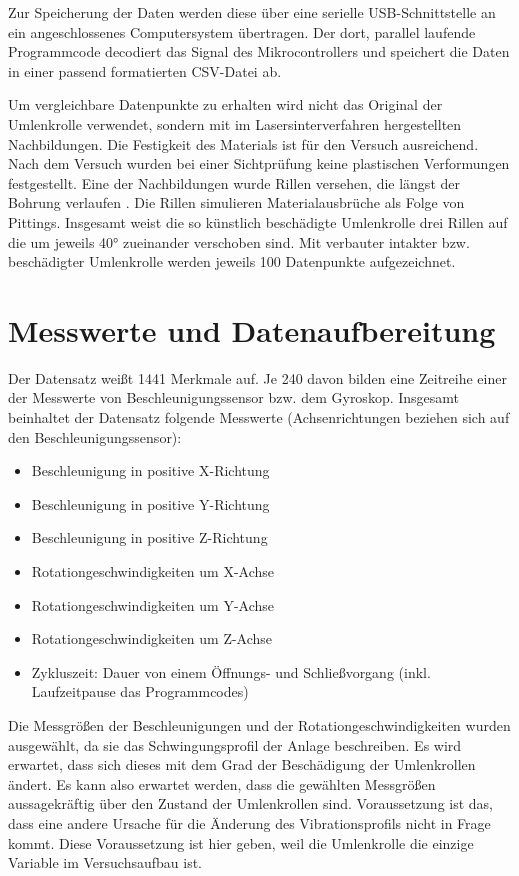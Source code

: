 Zur Speicherung der Daten werden diese über eine serielle USB-Schnittstelle an ein angeschlossenes Computersystem übertragen. Der dort, parallel laufende Programmcode decodiert das Signal des Mikrocontrollers und speichert die Daten in einer passend formatierten CSV-Datei ab.

Um vergleichbare Datenpunkte zu erhalten wird nicht das Original der Umlenkrolle verwendet, sondern mit im Lasersinterverfahren hergestellten Nachbildungen. Die Festigkeit des Materials ist für den Versuch ausreichend. Nach dem Versuch wurden bei einer Sichtprüfung keine plastischen Verformungen festgestellt. Eine der Nachbildungen wurde Rillen versehen, die längst der Bohrung verlaufen . Die Rillen simulieren Materialausbrüche als Folge von Pittings. Insgesamt weist die so künstlich beschädigte Umlenkrolle drei Rillen auf die um jeweils 40°  zueinander verschoben sind. Mit verbauter intakter bzw. beschädigter Umlenkrolle werden jeweils 100 Datenpunkte aufgezeichnet.
\section{Messwerte und Datenaufbereitung}
\label{sec:messdaten}
Der Datensatz weißt \num{1441} Merkmale auf. Je \num{240} davon bilden eine Zeitreihe einer der Messwerte von Beschleunigungssensor bzw. dem Gyroskop. Insgesamt beinhaltet der Datensatz folgende Messwerte (Achsenrichtungen beziehen sich auf den Beschleunigungssensor):
\begin{itemize}
	\item Beschleunigung in positive X-Richtung
	\item Beschleunigung in positive Y-Richtung
	\item Beschleunigung in positive Z-Richtung
	\item Rotationgeschwindigkeiten um X-Achse
	\item Rotationgeschwindigkeiten um Y-Achse
	\item Rotationgeschwindigkeiten um Z-Achse
	\item Zykluszeit: Dauer von einem Öffnungs- und Schließvorgang (inkl. Laufzeitpause das Programmcodes)
\end{itemize}

Die Messgrößen der Beschleunigungen und der Rotationgeschwindigkeiten wurden ausgewählt, da sie das Schwingungsprofil der Anlage beschreiben. Es wird erwartet, dass sich dieses mit dem Grad der Beschädigung der Umlenkrollen ändert. Es kann also erwartet werden, dass die gewählten Messgrößen aussagekräftig über den Zustand der Umlenkrollen sind. Voraussetzung ist das, dass eine andere Ursache für die Änderung des Vibrationsprofils nicht in Frage kommt. Diese Voraussetzung ist hier geben, weil die Umlenkrolle die einzige Variable im Versuchsaufbau ist.

